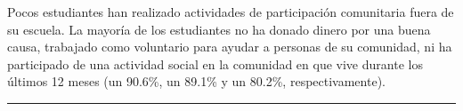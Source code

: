 \documentclass[
  14pt,
]{book}
\begin{document}
Pocos estudiantes han realizado actividades de participación comunitaria fuera de su escuela. La mayoría de los estudiantes no ha donado dinero por una buena causa, trabajado como voluntario para ayudar a personas de su comunidad, ni ha participado de una actividad social en la comunidad en que vive durante los últimos 12 meses (un 90.6\%, un 89.1\% y un 80.2\%, respectivamente).

\begin{center}\rule{0.5\linewidth}{0.5pt}\end{center}

  
\end{document}
